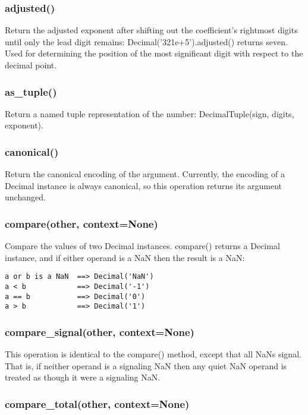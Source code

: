 \subsubsection{adjusted()}

Return the adjusted exponent after shifting out the coefficient’s rightmost digits until only the lead digit remains: Decimal('321e+5').adjusted() returns seven. Used for determining the position of the most significant digit with respect to the decimal point.

\subsubsection{as\_tuple()}

Return a named tuple representation of the number: DecimalTuple(sign, digits, exponent).

\subsubsection{canonical()}

Return the canonical encoding of the argument. Currently, the encoding of a Decimal instance is always canonical, so this operation returns its argument unchanged.

\subsubsection{compare(other, context=None)}

Compare the values of two Decimal instances. compare() returns a Decimal instance, and if either operand is a NaN then the result is a NaN:

\begin{lstlisting}
a or b is a NaN  ==> Decimal('NaN')
a < b            ==> Decimal('-1')
a == b           ==> Decimal('0')
a > b            ==> Decimal('1')
\end{lstlisting}

\subsubsection{compare\_signal(other, context=None)}

This operation is identical to the compare() method, except that all NaNs signal. That is, if neither operand is a signaling NaN then any quiet NaN operand is treated as though it were a signaling NaN.

\subsubsection{compare\_total(other, context=None)}

